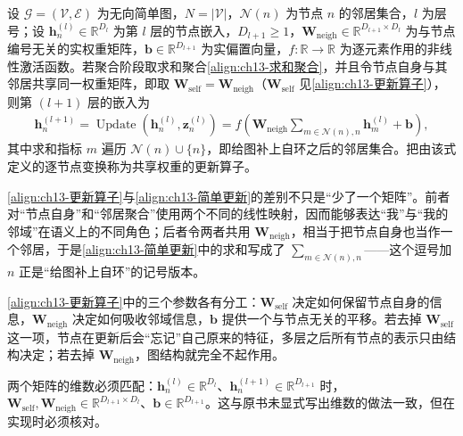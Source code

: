 \documentclass[../../main.tex]{subfiles}
\begin{document}
\begin{definition}[更新算子]\label{definition:ch13-更新算子}
设 $\mathcal{G}=(\mathcal{V},\mathcal{E})$ 为无向简单图，$N=|\mathcal{V}|$，$\mathcal{N}(n)$ 为节点 $n$ 的邻居集合，$l$ 为层号；设 $\bm{h}_n^{(l)}\in\mathbb{R}^{D_l}$ 为第 $l$ 层的节点嵌入，$D_{l+1}\geqslant1$，$\bm{W}_{\mathrm{neigh}}\in\mathbb{R}^{D_{l+1}\times D_l}$ 为与节点编号无关的实权重矩阵，$\bm{b}\in\mathbb{R}^{D_{l+1}}$ 为实偏置向量，$f:\mathbb{R}\to\mathbb{R}$ 为逐元素作用的非线性激活函数。若聚合阶段取求和聚合\eqref{align:ch13-求和聚合}，并且令节点自身与其邻居共享同一权重矩阵，即取 $\bm{W}_{\mathrm{self}}=\bm{W}_{\mathrm{neigh}}$（$\bm{W}_{\mathrm{self}}$ 见\eqref{align:ch13-更新算子}），则第 $(l+1)$ 层的嵌入为
\begin{align}
\bm{h}_n^{(l+1)}=\operatorname{Update}\!\left(\bm{h}_n^{(l)},\bm{z}_n^{(l)}\right)=f\!\left(\bm{W}_{\mathrm{neigh}}\sum_{m\in\mathcal{N}(n),n}\bm{h}_m^{(l)}+\bm{b}\right),
\label{align:ch13-简单更新}
\end{align}
其中求和指标 $m$ 遍历 $\mathcal{N}(n)\cup\{n\}$，即给图补上自环之后的邻居集合。把由该式定义的逐节点变换称为共享权重的更新算子。
\end{definition}

\begin{remark}
\eqref{align:ch13-更新算子}与\eqref{align:ch13-简单更新}的差别不只是“少了一个矩阵”。前者对“节点自身”和“邻居聚合”使用两个不同的线性映射，因而能够表达“我”与“我的邻域”在语义上的不同角色；后者令两者共用 $\bm{W}_{\mathrm{neigh}}$，相当于把节点自身也当作一个邻居，于是\eqref{align:ch13-简单更新}中的求和写成了 $\sum_{m\in\mathcal{N}(n),n}$——这个逗号加 $n$ 正是“给图补上自环”的记号版本。\par
\eqref{align:ch13-更新算子}中的三个参数各有分工：$\bm{W}_{\mathrm{self}}$ 决定如何保留节点自身的信息，$\bm{W}_{\mathrm{neigh}}$ 决定如何吸收邻域信息，$\bm{b}$ 提供一个与节点无关的平移。若去掉 $\bm{W}_{\mathrm{self}}$ 这一项，节点在更新后会“忘记”自己原来的特征，多层之后所有节点的表示只由结构决定；若去掉 $\bm{W}_{\mathrm{neigh}}$，图结构就完全不起作用。\par
两个矩阵的维数必须匹配：$\bm{h}_n^{(l)}\in\mathbb{R}^{D_l}$、$\bm{h}_n^{(l+1)}\in\mathbb{R}^{D_{l+1}}$ 时，$\bm{W}_{\mathrm{self}},\bm{W}_{\mathrm{neigh}}\in\mathbb{R}^{D_{l+1}\times D_l}$、$\bm{b}\in\mathbb{R}^{D_{l+1}}$。这与原书未显式写出维数的做法一致，但在实现时必须核对。
\end{remark}
\end{document}
